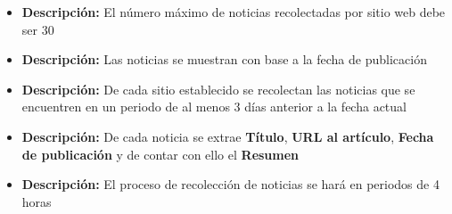 \begin{itemize}
  \item \textbf{Descripción:} El número máximo de noticias recolectadas por sitio web debe ser 30

\end{itemize}


\begin{itemize}
  \item \textbf{Descripción:} Las noticias se muestran con base a la fecha de publicación
\end{itemize}


\begin{itemize}
  \item \textbf{Descripción:} De cada sitio establecido se recolectan las noticias que se encuentren en un periodo de al menos 3 días anterior a la fecha actual
\end{itemize}


\begin{itemize}
  \item \textbf{Descripción:} De cada noticia se extrae \textbf{Título}, \textbf{URL al artículo}, \textbf{Fecha de publicación} y de contar con ello el \textbf{Resumen}

\end{itemize}



\begin{itemize}
  \item \textbf{Descripción:} El proceso de recolección de noticias se hará en periodos de 4 horas 

\end{itemize}